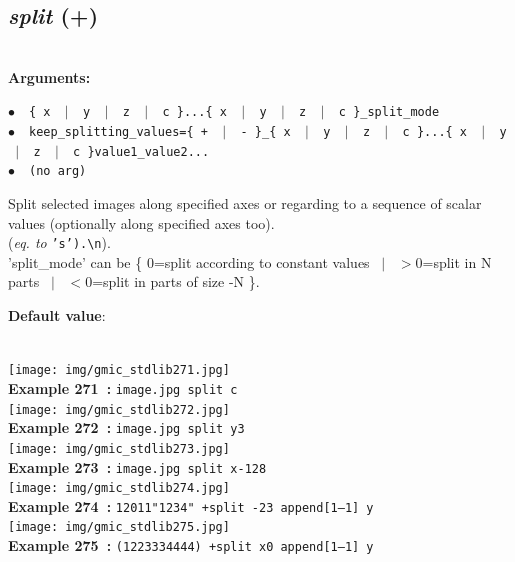 \documentclass[a4paper,10.5pt,twoside]{book}
\def\comma{\discretionary{,}{}{,}}
\newcommand{\Cb}[1]{\textcolor{cb}{#1}}
\newcommand{\Cc}[1]{\textcolor{cc}{#1}}
\begin{document}
\subsection{\emph{split} (+)}\vspace*{-0.7em}
~\\\textbf{\Cb{Arguments: }}\begin{flushleft}
{\small \Cb{\hspace*{0.5cm}$\bullet$~~\texttt{\{ x ~$|$~ y ~$|$~ z ~$|$~ c \}...\{ x ~$|$~ y ~$|$~ z ~$|$~ c \}{\comma}\_split\_mode}}}~~~\\
{\small \Cb{\hspace*{0.5cm}$\bullet$~~\texttt{keep\_splitting\_values=\{ + ~$|$~ - \}{\comma}\_\{ x ~$|$~ y ~$|$~ z ~$|$~ c \}...\{ x ~$|$~ y\- ~$|$~ z ~$|$~ c \}{\comma}value1{\comma}\_value2{\comma}...}}}~~~\\
{\small \Cb{\hspace*{0.5cm}$\bullet$~~\texttt{(no arg)}}}\end{flushleft}
Split selected images along specified axes{\comma} or regarding to a sequence of scalar values (optionally along specified axes too).
~\\(\emph{eq. to} {\small \texttt{'s').\textbackslash n}}).
~\\'split\_mode' can be \{ 0=split according to constant values ~$|$~ $>$0=split in N parts ~$|$~ $<$0=split in parts of size -N \}.
\begin{flushleft}\Cc{\textbf{Default value}:\\~\\\hspace*{0.5cm}{\small $\bullet$~~\texttt{'split\_mode=-1'.}}}\end{flushleft}
\begin{center}\texttt{[image: img/gmic\_stdlib271.jpg]}\\
{\footnotesize \textbf{Example 271~:} \texttt{image.jpg split c}}
\\\texttt{[image: img/gmic\_stdlib272.jpg]}\\
{\footnotesize \textbf{Example 272~:} \texttt{image.jpg split y{\comma}3}}
\\\texttt{[image: img/gmic\_stdlib273.jpg]}\\
{\footnotesize \textbf{Example 273~:} \texttt{image.jpg split x{\comma}-128}}
\\\texttt{[image: img/gmic\_stdlib274.jpg]}\\
{\footnotesize \textbf{Example 274~:} \texttt{1{\comma}20{\comma}1{\comma}1{\comma}"1{\comma}2{\comma}3{\comma}4" +split -{\comma}2{\comma}3 append[1--1] y}}
\\\texttt{[image: img/gmic\_stdlib275.jpg]}\\
{\footnotesize \textbf{Example 275~:} \texttt{(1{\comma}2{\comma}2{\comma}3{\comma}3{\comma}3{\comma}4{\comma}4{\comma}4{\comma}4) +split x{\comma}0 append[1--1] y}}
\end{center}
\end{document}
